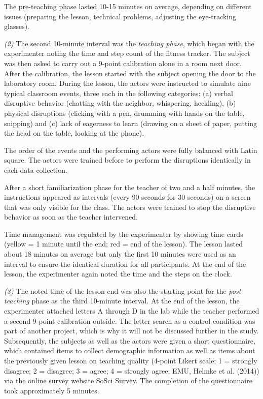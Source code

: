 \documentclass[
  man,floatsintext]{apa6}
\begin{document}
The pre-teaching phase lasted 10-15 minutes on average, depending on different issues (preparing the lesson, technical problems, adjusting the eye-tracking glasses).

\emph{(2)} The second 10-minute interval was the \emph{teaching phase}, which began with the experimenter noting the time and step count of the fitness tracker. The subject was then asked to carry out a 9-point calibration alone in a room next door. After the calibration, the lesson started with the subject opening the door to the laboratory room.
During the lesson, the actors were instructed to simulate nine typical classroom events, three each in the following categories: (a) verbal disruptive behavior (chatting with the neighbor, whispering, heckling), (b) physical disruptions (clicking with a pen, drumming with hands on the table, snipping) and (c) lack of eagerness to learn (drawing on a sheet of paper, putting the head on the table, looking at the phone).

The order of the events and the performing actors were fully balanced with Latin square. The actors were trained before to perform the disruptions identically in each data collection.

After a short familiarization phase for the teacher of two and a half minutes, the instructions appeared as intervals (every 90 seconds for 30 seconds) on a screen that was only visible for the class. The actors were trained to stop the disruptive behavior as soon as the teacher intervened.

Time management was regulated by the experimenter by showing time cards (yellow = 1 minute until the end; red = end of the lesson). The lesson lasted about 18 minutes on average but only the first 10 minutes were used as an interval to ensure the identical duration for all participants. At the end of the lesson, the experimenter again noted the time and the steps on the clock.

\emph{(3)} The noted time of the lesson end was also the starting point for the \emph{post-teaching} phase as the third 10-minute interval. At the end of the lesson, the experimenter attached letters A through D in the lab while the teacher performed a second 9-point calibration outside. The letter search as a control condition was part of another project, which is why it will not be discussed further in the study. Subsequently, the subjects as well as the actors were given a short questionnaire, which contained items to collect demographic information as well as items about the previously given lesson on teaching quality (4-point Likert scale; 1 = strongly disagree; 2 = disagree; 3 = agree; 4 = strongly agree; EMU, Helmke et al. (2014)) via the online survey website SoSci Survey. The completion of the questionnaire took approximately 5 minutes.
\end{document}
